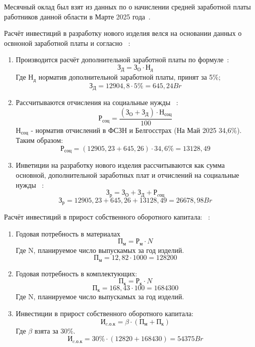 

Месячный оклад был взят из данных по о начислении средней заработной
платы работников данной области в Марте 2025
года~\cite{belstat-salary}.

% 

Расчёт инвестиций в разработку нового изделия велся на основании данных о освноной
заработной платы и согласно ~\cite{bsuir-project-economics}:
\begin{enumerate}
\item Производится расчёт дополнительной заработной платы по формуле~\cite{bsuir-project-economics}:
  \begin{equation} З_Д = З_О \cdot Н_д \end{equation}
  Где $Н_д$ норматив дополнительной заработной платы, принят за 5\%;
  $$З_Д = 12904,8 \cdot 5\% = 645,24Br $$
\item Рассчитываются отчисления на социальные нужды ~\cite{bsuir-project-economics}:
  \begin{equation}
    Р_{соц} = \frac{(З_О + З_Д) \cdot Н_{соц}}{100}
  \end{equation}
  $Н_{соц}$ - норматив отчислений в ФСЗН и Белгосстрах (На Май 2025 34,6\%).
  Таким образом:
  $$Р_{соц} = (12905,23 + 645,26) \cdot 34,6\% = 13128,49$$
\item Инветиции на разработку нового изделия рассчитываются как сумма
основной, дополнительной заработных плат и отчислений на социальные
нужды ~\cite{bsuir-project-economics}:
\begin{equation}
  З_р = З_О + З_Д +Р_{cоц}
\end{equation}
 $$ З_р = 12905,23 + 645,26 + 13128,49 = 26678,98Br$$
\end{enumerate}


Расчёт инвестиций в прирост собственного оборотного капитала:
~\cite{bsuir-project-economics}:
\begin{enumerate}
\item Годовая потребность в материалах
  \begin{equation}
    П_м = Р_м \cdot N
  \end{equation}
Где N, планируемое число выпускамых за год изделий.
  $$  П_м = 12,82 \cdot 1000 = 128200$$
\item Годовая потребность в комплектующих:
  \begin{equation}
    П_к = Р_к \cdot N
  \end{equation}
  $$П_к = 168,43 \cdot 100 = 1684300$$
Где N, планируемое число выпускамых за год изделий.

\item Инвестиции в прирост собственного оборотного капитала:
\begin{equation}
  И_{c.о.к} = \beta \cdot (П_м + П_к)
\end{equation}
Где $\beta$ взята за 30\%.
$$   И_{c.о.к} = 30\% \cdot (12820 + 168430) = 54375Br$$
\end{enumerate}

